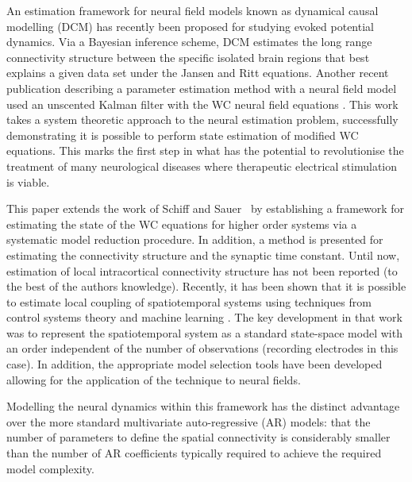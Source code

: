 \documentclass[12pt]{iopart}
\begin{document}
An estimation framework for neural field models known as dynamical causal modelling (DCM) \cite{David2003,David2006} has recently been proposed for studying evoked potential dynamics. Via a Bayesian inference scheme, DCM estimates the long range connectivity structure between the specific isolated brain regions that best explains a given data set under the Jansen and Ritt equations. Another recent publication describing a parameter estimation method with a neural field model used an unscented Kalman filter with the WC neural field equations \cite{schiff2008kalman}. This work takes a system theoretic approach to the neural estimation problem, successfully demonstrating it is possible to perform state estimation of modified WC equations. This marks the first step in what has the potential to revolutionise the treatment of many neurological diseases where therapeutic electrical stimulation is viable.


This paper extends the work of Schiff and Sauer~\cite{schiff2008kalman} by establishing a framework for estimating the state of the WC equations for higher order systems via a systematic model reduction procedure. In addition, a method is presented for estimating the connectivity structure and the synaptic time constant. Until now, estimation of local intracortical connectivity structure has not been reported (to the best of the authors knowledge). Recently, it has been shown that it is possible to estimate local coupling of spatiotemporal systems using techniques from control systems theory and machine learning \cite{Dewar2009}. The key development in that work was to represent the spatiotemporal system as a standard state-space model with an order independent of the number of observations (recording electrodes in this case). In addition, the appropriate model selection tools have been developed \cite{Scerri2009} allowing for the application of the technique to neural fields. 

Modelling the neural dynamics within this framework has the distinct advantage over the more standard multivariate auto-regressive (AR) models: that the number of parameters to define the spatial connectivity is considerably smaller than the number of AR coefficients typically required to achieve the required model complexity. 
\end{document}
